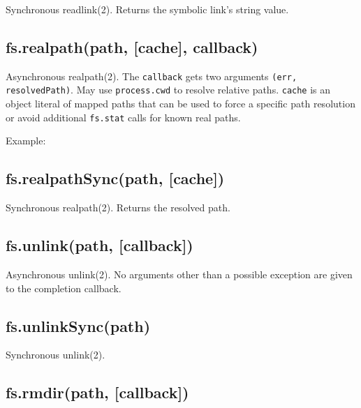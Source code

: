 Synchronous readlink(2). Returns the symbolic link's string value.

\subsection{fs.realpath(path, {[}cache{]}, callback)}

Asynchronous realpath(2). The \texttt{callback} gets two arguments
\texttt{(err, resolvedPath)}. May use \texttt{process.cwd} to resolve
relative paths. \texttt{cache} is an object literal of mapped paths that
can be used to force a specific path resolution or avoid additional
\texttt{fs.stat} calls for known real paths.

Example:

\begin{Shaded}
\begin{Highlighting}[]
 \NormalTok{:}\NormalTok{\};}
\NormalTok{(} 
    
\NormalTok{\});}
\end{Highlighting}
\end{Shaded}

\subsection{fs.realpathSync(path, {[}cache{]})}

Synchronous realpath(2). Returns the resolved path.

\subsection{fs.unlink(path, {[}callback{]})}

Asynchronous unlink(2). No arguments other than a possible exception are
given to the completion callback.

\subsection{fs.unlinkSync(path)}

Synchronous unlink(2).

\subsection{fs.rmdir(path, {[}callback{]})}

